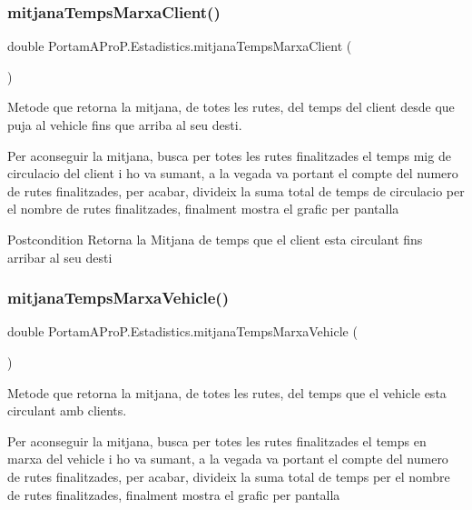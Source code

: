\subsubsection{\texorpdfstring{mitjana\+Temps\+Marxa\+Client()}{mitjanaTempsMarxaClient()}}
{\footnotesize\ttfamily double Portam\+A\+Pro\+P.\+Estadistics.\+mitjana\+Temps\+Marxa\+Client (\begin{DoxyParamCaption}{ }\end{DoxyParamCaption})}



Metode que retorna la mitjana, de totes les rutes, del temps del client desde que puja al vehicle fins que arriba al seu desti. 

Per aconseguir la mitjana, busca per totes les rutes finalitzades el temps mig de circulacio del client i ho va sumant, a la vegada va portant el compte del numero de rutes finalitzades, per acabar, divideix la suma total de temps de circulacio per el nombre de rutes finalitzades, finalment mostra el grafic per pantalla

\begin{DoxyPostcond}{Postcondition}
Retorna la Mitjana de temps que el client esta circulant fins arribar al seu desti 
\end{DoxyPostcond}
\mbox{\label{class_portam_a_pro_p_1_1_estadistics_a6c53fd82b51c9383aa70b876d5ac7eb0}} 
\subsubsection{\texorpdfstring{mitjana\+Temps\+Marxa\+Vehicle()}{mitjanaTempsMarxaVehicle()}}
{\footnotesize\ttfamily double Portam\+A\+Pro\+P.\+Estadistics.\+mitjana\+Temps\+Marxa\+Vehicle (\begin{DoxyParamCaption}{ }\end{DoxyParamCaption})}



Metode que retorna la mitjana, de totes les rutes, del temps que el vehicle esta circulant amb clients. 

Per aconseguir la mitjana, busca per totes les rutes finalitzades el temps en marxa del vehicle i ho va sumant, a la vegada va portant el compte del numero de rutes finalitzades, per acabar, divideix la suma total de temps per el nombre de rutes finalitzades, finalment mostra el grafic per pantalla

